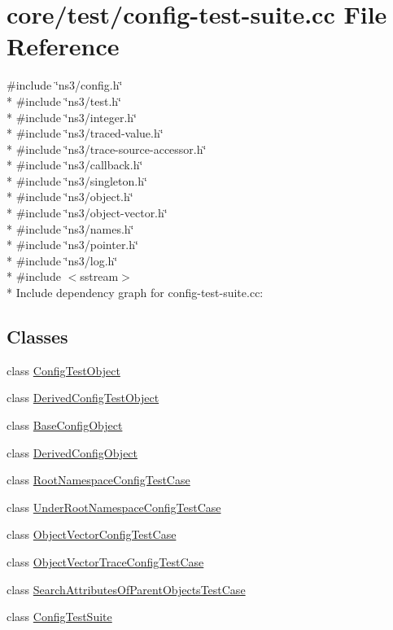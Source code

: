 \hypertarget{config-test-suite_8cc}{}\section{core/test/config-\/test-\/suite.cc File Reference}
\label{config-test-suite_8cc}
{\ttfamily \#include \char`\"{}ns3/config.\+h\char`\"{}}\\*
{\ttfamily \#include \char`\"{}ns3/test.\+h\char`\"{}}\\*
{\ttfamily \#include \char`\"{}ns3/integer.\+h\char`\"{}}\\*
{\ttfamily \#include \char`\"{}ns3/traced-\/value.\+h\char`\"{}}\\*
{\ttfamily \#include \char`\"{}ns3/trace-\/source-\/accessor.\+h\char`\"{}}\\*
{\ttfamily \#include \char`\"{}ns3/callback.\+h\char`\"{}}\\*
{\ttfamily \#include \char`\"{}ns3/singleton.\+h\char`\"{}}\\*
{\ttfamily \#include \char`\"{}ns3/object.\+h\char`\"{}}\\*
{\ttfamily \#include \char`\"{}ns3/object-\/vector.\+h\char`\"{}}\\*
{\ttfamily \#include \char`\"{}ns3/names.\+h\char`\"{}}\\*
{\ttfamily \#include \char`\"{}ns3/pointer.\+h\char`\"{}}\\*
{\ttfamily \#include \char`\"{}ns3/log.\+h\char`\"{}}\\*
{\ttfamily \#include $<$sstream$>$}\\*
Include dependency graph for config-\/test-\/suite.cc\+:
\subsection*{Classes}
\begin{DoxyCompactItemize}
\item 
class \hyperlink{classConfigTestObject}{Config\+Test\+Object}
\item 
class \hyperlink{classDerivedConfigTestObject}{Derived\+Config\+Test\+Object}
\item 
class \hyperlink{classBaseConfigObject}{Base\+Config\+Object}
\item 
class \hyperlink{classDerivedConfigObject}{Derived\+Config\+Object}
\item 
class \hyperlink{classRootNamespaceConfigTestCase}{Root\+Namespace\+Config\+Test\+Case}
\item 
class \hyperlink{classUnderRootNamespaceConfigTestCase}{Under\+Root\+Namespace\+Config\+Test\+Case}
\item 
class \hyperlink{classObjectVectorConfigTestCase}{Object\+Vector\+Config\+Test\+Case}
\item 
class \hyperlink{classObjectVectorTraceConfigTestCase}{Object\+Vector\+Trace\+Config\+Test\+Case}
\item 
class \hyperlink{classSearchAttributesOfParentObjectsTestCase}{Search\+Attributes\+Of\+Parent\+Objects\+Test\+Case}
\item 
class \hyperlink{classConfigTestSuite}{Config\+Test\+Suite}
\end{DoxyCompactItemize}

